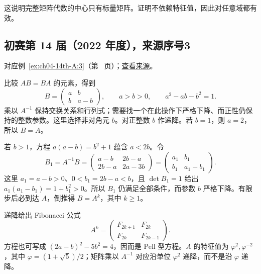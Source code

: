 \documentclass[12pt,fontset=fandol]{ctexart}
\begin{document}
\begin{remark}[方法与条件]

这说明完整矩阵代数的中心只有标量矩阵。证明不依赖特征值，因此对任意域都有效。

\end{remark}

\subsection{初赛第 14 届（2022 年度），来源序号3}\label{ans:ch04-14th-A:3}\label{pr:ch04-14th-A:3}

对应例~\ref{ex:ch04-14th-A:3}（第~\pageref{ex:ch04-14th-A:3} 页）；\href{https://github.com/lzxcr/cmc-mathematics/blob/64916fa1fdbc3e444a652eca204d5669058ee321/src/problems/preliminary/14/03.md}{查看来源}。

\begin{solve}

比较 $AB=BA$ 的元素，得到
\[
B=\begin{pmatrix}a&b\\b&a-b\end{pmatrix},\qquad
 a>b>0,\qquad a^2-ab-b^2=1.
\]
乘以 $A^{-1}$ 保持交换关系和行列式；需要找一个在此操作下严格下降、而正性仍保持的整数参数。这里选择非对角元 $b$。对正整数 $b$ 作递降。若 $b=1$，则 $a=2$，所以 $B=A$。

若 $b>1$，方程 $a(a-b)=b^2+1$ 蕴含 $a<2b$。令
\[
B_1=A^{-1}B
=\begin{pmatrix}a-b&2b-a\\2b-a&2a-3b\end{pmatrix}
=\begin{pmatrix}a_1&b_1\\b_1&a_1-b_1\end{pmatrix}.
\]
这里 $a_1=a-b>0$、$0<b_1=2b-a<b$，且 $\det B_1=1$ 给出 $a_1(a_1-b_1)=1+b_1^2>0$。所以 $B_1$ 仍满足全部条件，而参数 $b$ 严格下降。有限步后必到达 $A$，倒推得 $B=A^k$，其中 $k\geq1$。

\end{solve}

\begin{remark}[方法与条件]

递降给出 Fibonacci 公式
\[
A^k=\begin{pmatrix}F_{2k+1}&F_{2k}\\F_{2k}&F_{2k-1}\end{pmatrix}.
\]
方程也可写成 $(2a-b)^2-5b^2=4$，因而是 Pell 型方程。$A$ 的特征值为 $\varphi^2,\varphi^{-2}$，其中 $\varphi=(1+\sqrt5)/2$；矩阵乘以 $A^{-1}$ 对应沿单位 $\varphi^2$ 递降，而不是沿 $\varphi$ 递降。

\end{remark}
\end{document}
